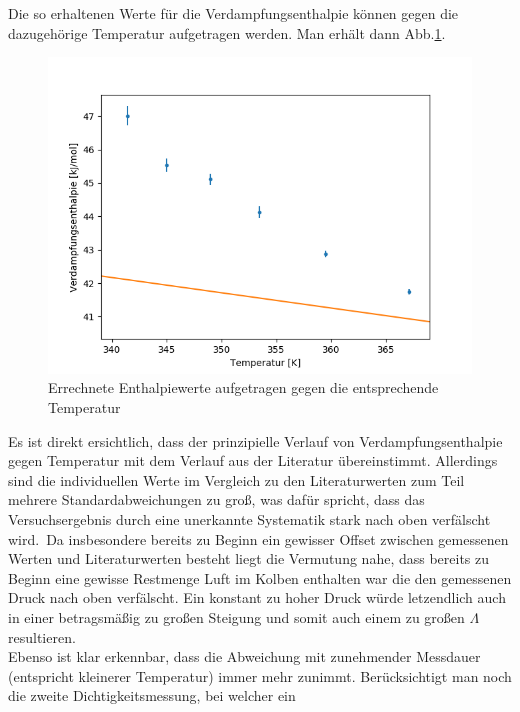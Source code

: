 \documentclass[12pt,a4paper]{article}
\begin{document}
Die so erhaltenen Werte für die Verdampfungsenthalpie können gegen die dazugehörige Temperatur aufgetragen werden. Man erhält dann Abb.\ref{fig:EntTempB}.

\begin{figure}
\begin{center}
\includegraphics[scale=0.8]{Bilder/Enthalpie_gegen_TempB}
\caption[Enthalpie - Temperatur]{Errechnete Enthalpiewerte aufgetragen gegen die entsprechende Temperatur}
\label{fig:EntTempB}
\end{center}
\end{figure}

Es ist direkt ersichtlich, dass der prinzipielle Verlauf von Verdampfungsenthalpie gegen Temperatur mit dem Verlauf aus der Literatur übereinstimmt. Allerdings sind die individuellen Werte im Vergleich zu den Literaturwerten zum Teil mehrere Standardabweichungen zu groß, was dafür spricht, dass das Versuchsergebnis durch eine unerkannte Systematik stark nach oben verfälscht wird.\
Da insbesondere bereits zu Beginn ein gewisser Offset zwischen gemessenen Werten und Literaturwerten besteht liegt die Vermutung nahe, dass bereits zu Beginn eine gewisse Restmenge Luft im Kolben enthalten war die den gemessenen Druck nach oben verfälscht. Ein konstant zu hoher Druck würde letzendlich auch in einer betragsmäßig zu großen Steigung und somit auch einem zu großen $\Lambda$ resultieren.\\
Ebenso ist klar erkennbar, dass die Abweichung mit zunehmender Messdauer (entspricht kleinerer Temperatur) immer mehr zunimmt. Berücksichtigt man noch die zweite Dichtigkeitsmessung, bei welcher ein 
\end{document}
